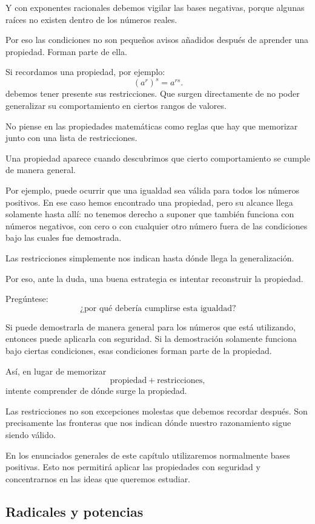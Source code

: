 Y con exponentes racionales debemos vigilar las bases negativas, porque algunas raíces no existen dentro de los números reales.

Por eso las condiciones no son pequeños avisos añadidos después de aprender una propiedad. Forman parte de ella.

Si recordamos una propiedad, por ejemplo:
\[
(a^r)^s=a^{rs}.
\]
debemos tener presente sus restricciones. Que surgen directamente de no poder generalizar su comportamiento en ciertos rangos de valores.

\begin{note}
No piense en las propiedades matemáticas como reglas que hay que memorizar junto con una lista de restricciones.

Una propiedad aparece cuando descubrimos que cierto comportamiento se cumple de manera general.

Por ejemplo, puede ocurrir que una igualdad sea válida para todos los números positivos. En ese caso hemos encontrado una propiedad, pero su alcance llega solamente hasta allí: no tenemos derecho a suponer que también funciona con números negativos, con cero o con cualquier otro número fuera de las condiciones bajo las cuales fue demostrada.

Las restricciones simplemente nos indican hasta dónde llega la generalización.

Por eso, ante la duda, una buena estrategia es intentar reconstruir la propiedad.

Pregúntese:
\[
\text{¿por qué debería cumplirse esta igualdad?}
\]

Si puede demostrarla de manera general para los números que está utilizando, entonces puede aplicarla con seguridad. Si la demostración solamente funciona bajo ciertas condiciones, esas condiciones forman parte de la propiedad.

Así, en lugar de memorizar
\[
\text{propiedad}+\text{restricciones},
\]
intente comprender de dónde surge la propiedad.

Las restricciones no son excepciones molestas que debemos recordar después. Son precisamente las fronteras que nos indican dónde nuestro razonamiento sigue siendo válido.
\end{note}

En los enunciados generales de este capítulo utilizaremos normalmente bases positivas. Esto nos permitirá aplicar las propiedades con seguridad y concentrarnos en las ideas que queremos estudiar.

\subsection{Radicales y potencias}

